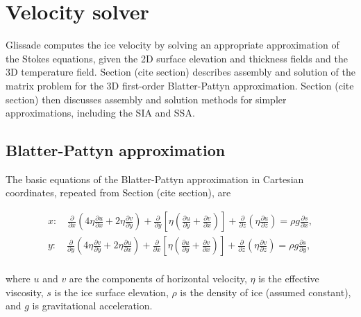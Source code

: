 
\section{Velocity solver}
\label{sc:glissade-velocity}

Glissade computes the ice velocity by solving an appropriate
approximation of the Stokes equations, given the 2D surface elevation and thickness fields and
the 3D temperature field.
Section (cite section) describes assembly and solution of the matrix problem for the 3D first-order
Blatter-Pattyn approximation.  Section (cite section) then discusses assembly and solution
methods for simpler approximations, including the SIA and SSA.

\subsection{Blatter-Pattyn approximation}

The basic equations of the Blatter-Pattyn approximation in Cartesian coordinates, repeated from Section (cite section), are 

\begin{equation}
  \label{gliss.eq.stress_balance}
  \begin{split}
    x: \quad \frac{\partial }{\partial x}\left( 4 \eta \frac{\partial u}{\partial x} +  2 \eta \frac{\partial v}{\partial y} \right) + \frac{\partial }{\partial y}\left[ \eta \left( \frac{\partial u}{\partial y} + \frac{\partial v}{\partial x} \right) \right]+\frac{\partial }{\partial z}\left( \eta \frac{\partial u}{\partial z} \right) = \rho g\frac{\partial s}{\partial x}, \\
    y: \quad \frac{\partial }{\partial y}\left( 4 \eta \frac{\partial v}{\partial y} +  2 \eta \frac{\partial u}{\partial x} \right) + \frac{\partial }{\partial x}\left[ \eta \left( \frac{\partial u}{\partial y} + \frac{\partial v}{\partial x} \right) \right]+\frac{\partial }{\partial z}\left( \eta \frac{\partial v}{\partial z} \right) = \rho g\frac{\partial s}{\partial y},  \\
  \end{split}
\end{equation}

\noindent
where $u$ and $v$ are the components of horizontal velocity, $\eta$ is the effective viscosity, $s$ is the ice surface elevation,
$\rho$ is the density of ice (assumed constant), and $g$ is gravitational acceleration.  

